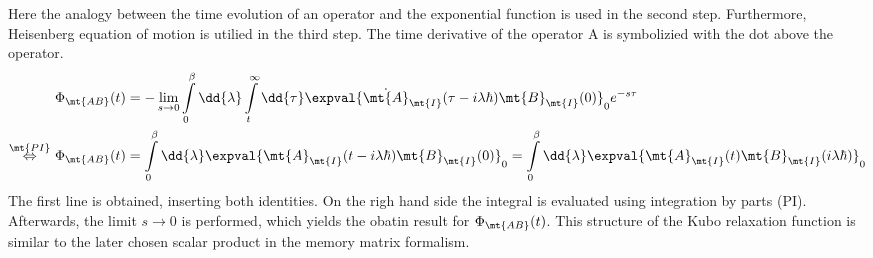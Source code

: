 %
Here the analogy between the time evolution of an operator and the exponential function is used in the second step.
Furthermore, Heisenberg equation of motion is utilied in the third step.
The time derivative of the operator A is symbolizied with the dot above the operator.
%
\begin{align}
	&\Phi_{\mt{AB}}(t) = -\lim\limits_{s \to 0} \int\limits_{0}^{\beta} \dd{\lambda} \int\limits_{t}^{\infty} \dd{\tau} \expval{\dot{\mt{A}}_{\mt{I}}(\tau-i\lambda\hbar) \mt{B}_{\mt{I}}(0)}_{0} e^{-s\tau}
	\notag \\
	\overset{\mt{PI}}{\Leftrightarrow}\ &\Phi_{\mt{AB}}(t) = \int\limits_{0}^{\beta} \dd{\lambda} \expval{\mt{A}_{\mt{I}}(t-i\lambda\hbar) \mt{B}_{\mt{I}}(0)}_{0} = \int\limits_{0}^{\beta} \dd{\lambda} \expval{\mt{A}_{\mt{I}}(t) \mt{B}_{\mt{I}}(i\lambda\hbar)}_{0}
	\label{eq:Kubo relaxation function 2.0}
\end{align}
%
The first line is obtained, inserting both identities.
On the righ hand side the integral is evaluated using integration by parts (PI).
Afterwards, the limit $s\to 0$ is performed, which yields the obatin result for $\Phi_{\mt{AB}}(t)$.
This structure of the Kubo relaxation function is similar to the later chosen scalar product in the memory matrix formalism.


%
%
